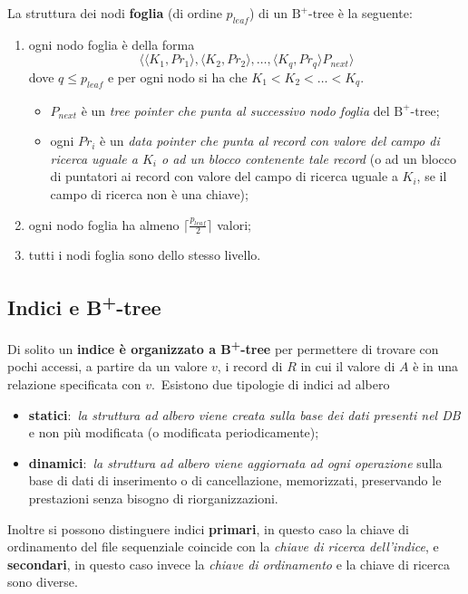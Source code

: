 \vspace{12pt}
\noindent La struttura dei nodi \textbf{foglia} (di ordine $p_{leaf}$) di un $\mathrm{B^+\textrm{-}tree}$ è la seguente:
\begin{enumerate}
	\item ogni nodo foglia è della forma \[\langle \langle K_1, Pr_1\rangle, \langle K_2, Pr_2\rangle, \dots, \langle K_q, Pr_q \rangle P_{next}\rangle\] dove $q \leq p_{\mathit{leaf}}$ e per ogni nodo si ha che $K_1 < K_2 < \dots < K_q$.
	      \begin{itemize}
		      \item $P_{next}$ è un \textit{tree pointer che punta al successivo nodo foglia} del $\mathrm{B^+\textrm{-}tree}$;
		      \item ogni $Pr_i$ è un \textit{data pointer che punta al record con valore del campo di ricerca uguale a $K_i$ o ad un blocco contenente tale record} (o ad un blocco di puntatori ai record con valore del campo di ricerca uguale a $K_i$, se il campo di ricerca non è una chiave);
	      \end{itemize}
	\item ogni nodo foglia ha almeno $\lceil\frac{p_{leaf}}{2}\rceil$ valori;
	\item tutti i nodi foglia sono dello stesso livello.
\end{enumerate}

\subsection{Indici e B\textsuperscript{+}-tree}

Di solito un \textbf{indice è organizzato a B\textsuperscript{+}-tree} per permettere di trovare con pochi accessi, a partire da un valore $v$, i record di $R$ in cui il valore di $A$ è in una relazione specificata con $v$.\
Esistono due tipologie di indici ad albero
\begin{itemize}
	\item\textbf{statici}:\ \textit{la struttura ad albero viene creata sulla base dei dati presenti nel DB} e non più modificata (o modificata periodicamente);
	\item\textbf{dinamici}:\ \textit{la struttura ad albero viene aggiornata ad ogni operazione} sulla base di dati di inserimento o di cancellazione, memorizzati, preservando le prestazioni senza bisogno di riorganizzazioni.
\end{itemize}

\noindent Inoltre si possono distinguere indici \textbf{primari}, in questo caso la chiave di or\-dinamento del file sequenziale coincide con la \textit{chiave di ricerca dell'indice}, e \textbf{secondari}, in questo caso invece la \textit{chiave di ordinamento} e la chiave di ricerca sono diverse.

